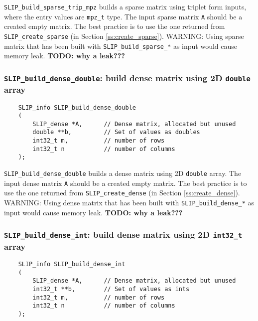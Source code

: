 \documentclass[12pt]{article}
\theoremstyle{definition}
\begin{document}
\verb|SLIP_build_sparse_trip_mpz| builds a sparse matrix using triplet form
inputs, where the entry values are \verb|mpz_t| type. The input sparse matrix
\verb|A| should be a created empty matrix. The best practice is to use
the one returned from \verb|SLIP_create_sparse| (in Section
\ref{ss:create_sparse}). WARNING: Using sparse matrix that has been built with
\verb|SLIP_build_sparse_*| as input would cause memory leak.
{\bf TODO: why a leak???} %

\cprotect\subsubsection{\verb|SLIP_build_dense_double|: build dense matrix using 2D \verb|double| array}
\label{s:user:build_dense_double}

\begin{mdframed}[userdefinedwidth=6in]
{\footnotesize
\begin{verbatim}
    SLIP_info SLIP_build_dense_double
    (
        SLIP_dense *A,      // Dense matrix, allocated but unused
        double **b,         // Set of values as doubles
        int32_t m,          // number of rows
        int32_t n           // number of columns
    );
\end{verbatim}
} \end{mdframed}

\verb|SLIP_build_dense_double| builds a dense matrix using 2D \verb|double|
array. The input dense matrix \verb|A| should be a created empty matrix.
The best practice is to use the one returned from \verb|SLIP_create_dense| (in
Section \ref{ss:create_dense}). WARNING: Using dense matrix that has been built
with \verb|SLIP_build_dense_*| as input would cause memory leak.
{\bf TODO: why a leak???} %

\cprotect\subsubsection{\verb|SLIP_build_dense_int|: build dense matrix using 2D \verb|int32_t| array}
\label{s:user:build_dense_int}

\begin{mdframed}[userdefinedwidth=6in]
{\footnotesize
\begin{verbatim}
    SLIP_info SLIP_build_dense_int
    (
        SLIP_dense *A,      // Dense matrix, allocated but unused
        int32_t **b,        // Set of values as ints
        int32_t m,          // number of rows
        int32_t n           // number of columns
    );
\end{verbatim}
} \end{mdframed}
\end{document}
